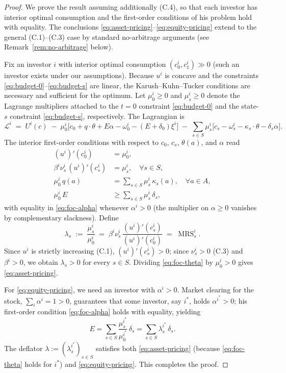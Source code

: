 \documentclass[11pt,a4paper]{article}
\def\geq{\geqslant}
\DeclareMathOperator{\MRS}{MRS}
\theoremstyle{plain}
\theoremstyle{definition}
\theoremstyle{remark}
\begin{document}
\begin{proof}
We prove the result assuming additionally (C.4), so that each investor has interior optimal consumption and the first-order conditions of his problem hold with equality. The conclusions \eqref{eq:asset-pricing}--\eqref{eq:equity-pricing} extend to the general (C.1)--(C.3) case by standard no-arbitrage arguments (see Remark~\ref{rem:no-arbitrage} below).

Fix an investor $i$ with interior optimal consumption $(c^i_0,c^i_1)\gg 0$ (such an investor exists under our assumptions). Because $u^i$ is concave and the constraints \eqref{eq:budget-0}--\eqref{eq:budget-s} are linear, the Karush--Kuhn--Tucker conditions are necessary and sufficient for the optimum. Let $\mu^i_0\geq 0$ and $\mu^i_s\geq 0$ denote the Lagrange multipliers attached to the $t=0$ constraint \eqref{eq:budget-0} and the state-$s$ constraint \eqref{eq:budget-s}, respectively. The Lagrangian is
\[
  \mathcal{L}^i \;=\; U^i(c) \;-\; \mu^i_0\bigl[c_0 + q\cdot\theta + E\alpha - \omega^i_0 - (E+\delta_0)\xi^i\bigr]
  \;-\; \sum_{s\in S} \mu^i_s\bigl[c_s - \omega^i_s - \kappa_s\cdot\theta - \delta_s\alpha\bigr].
\]
The interior first-order conditions with respect to $c_0$, $c_s$, $\theta(a)$, and $\alpha$ read
\begin{align}
  (u^i)'(c^i_0) &= \mu^i_0,
  \label{eq:foc-c0}\\
  \beta^i\nu^i_s\,(u^i)'(c^i_s) &= \mu^i_s,
  \quad \forall s\in S,
  \label{eq:foc-cs}\\
  \mu^i_0\,q(a) &= \sum_{s\in S} \mu^i_s\,\kappa_s(a),
  \quad \forall a\in A,
  \label{eq:foc-theta}\\
  \mu^i_0\,E &\geq \sum_{s\in S} \mu^i_s\,\delta_s,
  \label{eq:foc-alpha}
\end{align}
with equality in \eqref{eq:foc-alpha} whenever $\alpha^i>0$ (the multiplier on $\alpha\geq 0$ vanishes by complementary slackness). Define
\begin{equation}\label{eq:lambda-def}
  \lambda_s \;:=\; \frac{\mu^i_s}{\mu^i_0} \;=\; \beta^i\nu^i_s\,\frac{(u^i)'(c^i_s)}{(u^i)'(c^i_0)} \;=\; \MRS^i_s.
\end{equation}
Since $u^i$ is strictly increasing (C.1), $(u^i)'(c^i_s)>0$; since $\nu^i_s>0$ (C.3) and $\beta^i>0$, we obtain $\lambda_s>0$ for every $s\in S$. Dividing \eqref{eq:foc-theta} by $\mu^i_0>0$ gives \eqref{eq:asset-pricing}.

For \eqref{eq:equity-pricing}, we need an investor with $\alpha^i>0$. Market clearing for the stock, $\sum_i \alpha^i = 1>0$, guarantees that some investor, say $i^\ast$, holds $\alpha^{i^\ast}>0$; his first-order condition \eqref{eq:foc-alpha} holds with equality, yielding
\[
  E = \sum_{s\in S}\frac{\mu^{i^\ast}_s}{\mu^{i^\ast}_0}\,\delta_s = \sum_{s\in S}\lambda^{i^\ast}_s\,\delta_s.
\]
The deflator $\lambda:=(\lambda^{i^\ast}_s)_{s\in S}$ satisfies both \eqref{eq:asset-pricing} (because \eqref{eq:foc-theta} holds for $i^\ast$) and \eqref{eq:equity-pricing}. This completes the proof.
\end{proof}
\end{document}
